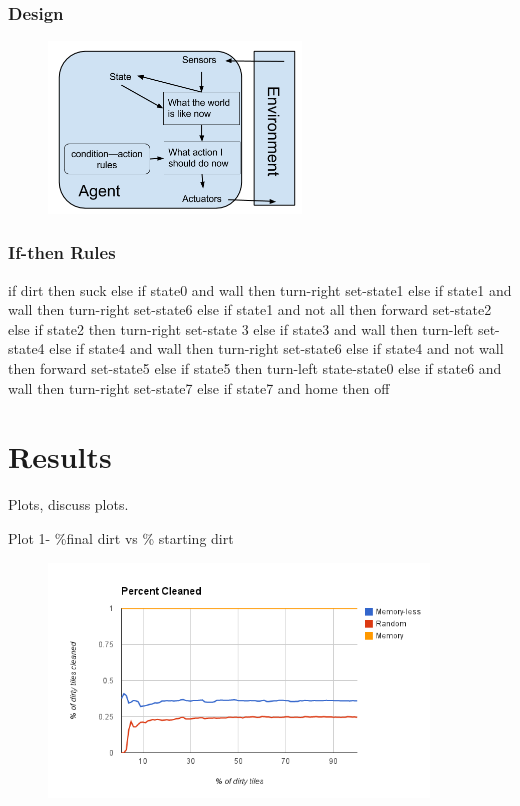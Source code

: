 \documentclass[a4paper,10pt]{article}
\begin{document}
\subsubsection{Design}
\begin{figure}[H]
	\begin{center}
		\includegraphics[width=0.6\textwidth]{MemoryReflex.png}
	\end{center}
\end{figure}
\subsubsection{If-then Rules}
if dirt then suck
else if state0 and wall then turn-right set-state1
else if state1 and wall then turn-right set-state6
else if state1 and not all then forward set-state2
else if state2 then turn-right set-state 3
else if state3 and wall then turn-left set-state4
else if state4 and wall then turn-right set-state6
else if state4 and not wall then forward set-state5
else if state5 then turn-left state-state0
else if state6 and wall then turn-right set-state7
else if state7 and home then off


\section{Results}
Plots, discuss plots.

Plot 1- \%final dirt vs \% starting dirt \\
\begin{figure}[H]
	\begin{center}
		\includegraphics[width=0.9\textwidth]{image.png}
	\end{center}
\end{figure}
\end{document}
